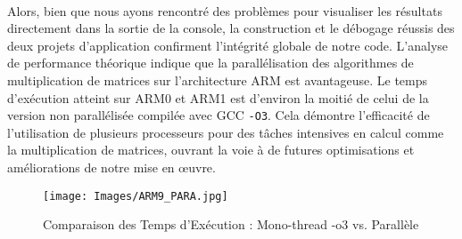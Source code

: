 \documentclass[../CSC_5RO06_TA.tex]{subfiles}
\begin{document}
\\
Alors, bien que nous ayons rencontré des problèmes pour visualiser les résultats directement dans la sortie de la console, la construction et le débogage réussis des deux projets d'application confirment l'intégrité globale de notre code. L'analyse de performance théorique indique que la parallélisation des algorithmes de multiplication de matrices sur l'architecture ARM est avantageuse. Le temps d'exécution atteint sur ARM0 et ARM1 est d'environ la moitié de celui de la version non parallélisée compilée avec GCC \texttt{-O3}. Cela démontre l'efficacité de l'utilisation de plusieurs processeurs pour des tâches intensives en calcul comme la multiplication de matrices, ouvrant la voie à de futures optimisations et améliorations de notre mise en œuvre.

\begin{figure}[H]
    \centering
    \texttt{[image: Images/ARM9\_PARA.jpg]}
    \caption{Comparaison des Temps d'Exécution : Mono-thread -o3 vs. Parallèle}
    \label{fig:7}
\end{figure}
\end{document}
